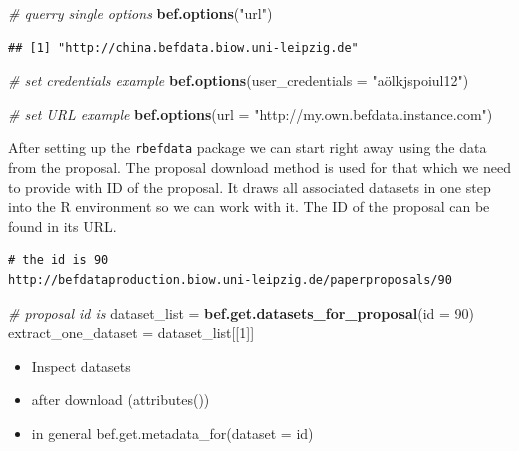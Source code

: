 \documentclass[]{article}
\newenvironment{Shaded}{}{}
\newcommand{\KeywordTok}[1]{\textcolor[rgb]{0.00,0.44,0.13}{\textbf{{#1}}}}
\newcommand{\DataTypeTok}[1]{\textcolor[rgb]{0.56,0.13,0.00}{{#1}}}
\newcommand{\DecValTok}[1]{\textcolor[rgb]{0.25,0.63,0.44}{{#1}}}
\newcommand{\StringTok}[1]{\textcolor[rgb]{0.25,0.44,0.63}{{#1}}}
\newcommand{\CommentTok}[1]{\textcolor[rgb]{0.38,0.63,0.69}{\textit{{#1}}}}
\newcommand{\NormalTok}[1]{{#1}}
\begin{document}
\begin{Shaded}
\begin{Highlighting}[]

\CommentTok{# querry single options}
\KeywordTok{bef.options}\NormalTok{(}\StringTok{"url"}\NormalTok{)}
\end{Highlighting}
\end{Shaded}

\begin{verbatim}
## [1] "http://china.befdata.biow.uni-leipzig.de"
\end{verbatim}

\begin{Shaded}
\begin{Highlighting}[]
\CommentTok{# set credentials example}
\KeywordTok{bef.options}\NormalTok{(}\DataTypeTok{user_credentials =} \StringTok{"aölkjspoiul12"}\NormalTok{)}
\end{Highlighting}
\end{Shaded}

\begin{Shaded}
\begin{Highlighting}[]
\CommentTok{# set URL example}
\KeywordTok{bef.options}\NormalTok{(}\DataTypeTok{url =} \StringTok{"http://my.own.befdata.instance.com"}\NormalTok{)}
\end{Highlighting}
\end{Shaded}

After setting up the \texttt{rbefdata} package we can start right away
using the data from the proposal. The proposal download method is used
for that which we need to provide with ID of the proposal. It draws all
associated datasets in one step into the R environment so we can work
with it. The ID of the proposal can be found in its URL.

\begin{verbatim}
# the id is 90
http://befdataproduction.biow.uni-leipzig.de/paperproposals/90
\end{verbatim}

\begin{Shaded}
\begin{Highlighting}[]
\CommentTok{# proposal id is}
\NormalTok{dataset_list = }\KeywordTok{bef.get.datasets_for_proposal}\NormalTok{(}\DataTypeTok{id =} \DecValTok{90}\NormalTok{)}
\NormalTok{extract_one_dataset = dataset_list[[}\DecValTok{1}\NormalTok{]]}
\end{Highlighting}
\end{Shaded}

\begin{itemize}
\itemsep1pt\parskip0pt
\item
  Inspect datasets
\item
  after download (attributes())
\item
  in general bef.get.metadata\_for(dataset = id)
\end{itemize}
\end{document}
